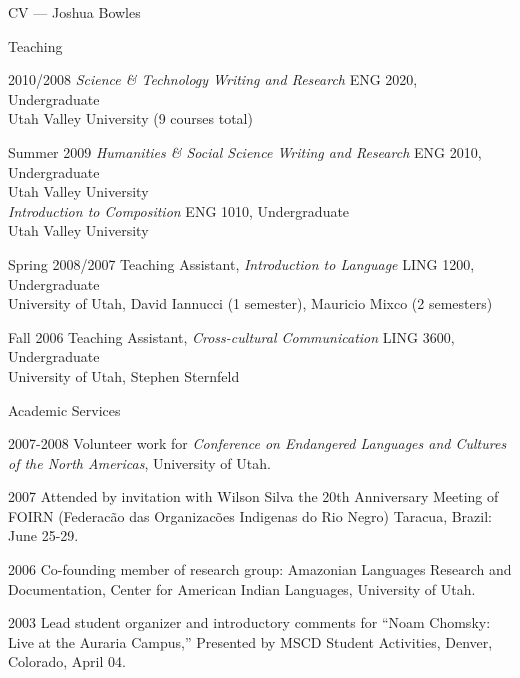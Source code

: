 \begin{cv}{CV --- Joshua Bowles}
\begin{cvlist}{Teaching}
\item[2010/2008]        \emph{Science \& Technology Writing and Research} ENG 2020, Undergraduate\\ 
                           Utah Valley University (9 courses total)
\item[Summer 2009]      \emph{Humanities \& Social Science Writing and Research} ENG 2010, Undergraduate\\
                           Utah Valley University\\
                        \emph{Introduction to Composition} ENG 1010, Undergraduate\\ 
                           Utah Valley University
\item[Spring 2008/2007] Teaching Assistant, \emph{Introduction to Language} LING 1200, Undergraduate\\
                        University of Utah, David Iannucci (1 semester), Mauricio Mixco (2 semesters)
\item[Fall 2006]        Teaching Assistant, \emph{Cross-cultural Communication} LING 3600, Undergraduate\\
                           University of Utah, Stephen Sternfeld                        
\end{cvlist}


\begin{cvlist}{Academic Services}
\item[2007-2008] Volunteer work for \textsl{Conference on Endangered Languages and Cultures of the
North Americas}, University of Utah.
\item[2007] Attended by invitation with Wilson Silva the 20th Anniversary Meeting of FOIRN
(Federac\~ao das Organizac\~oes Indigenas do Rio Negro) Taracua, Brazil: June 25-29.  
\item[2006] Co-founding member of research group: Amazonian Languages Research and Documentation,
Center for American Indian Languages, University of Utah. 
\item[2003] Lead student organizer and introductory comments for ``Noam Chomsky: Live at the Auraria
Campus,'' Presented by MSCD Student Activities, Denver, Colorado, April 04.
\end{cvlist}

\end{cv}
